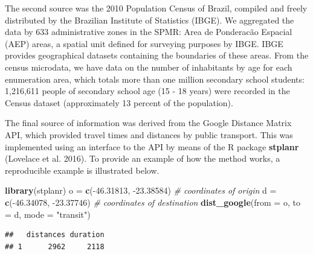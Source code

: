 \documentclass[]{article}
\newenvironment{Shaded}{\begin{snugshade}}{\end{snugshade}}
\newcommand{\KeywordTok}[1]{\textcolor[rgb]{0.13,0.29,0.53}{\textbf{{#1}}}}
\newcommand{\DataTypeTok}[1]{\textcolor[rgb]{0.13,0.29,0.53}{{#1}}}
\newcommand{\FloatTok}[1]{\textcolor[rgb]{0.00,0.00,0.81}{{#1}}}
\newcommand{\StringTok}[1]{\textcolor[rgb]{0.31,0.60,0.02}{{#1}}}
\newcommand{\CommentTok}[1]{\textcolor[rgb]{0.56,0.35,0.01}{\textit{{#1}}}}
\newcommand{\NormalTok}[1]{{#1}}
\begin{document}
The second source was the 2010 Population Census of Brazil,
compiled and freely distributed by the Brazilian Institute of Statistics
(IBGE). We aggregated the data by 633 administrative zones in the
SPMR: Area de Ponderacão Espacial (AEP)
areas, a spatial unit defined for surveying purposes by IBGE.
IBGE provides geographical datasets
containing the boundaries of these areas. From the census microdata, we
have data on the number of inhabitants by age for each enumeration area,
which totals more than one million secondary school students:
1,216,611 people of secondary school age (15 - 18 years) were recorded
in the Census dataset (approximately 13 percent of the population).

The final source of information was derived from the Google Distance
Matrix API, which provided travel times and distances by public
transport. This was implemented using an interface to the API by means
of the R package \textbf{stplanr} (Lovelace et al. 2016). To provide an
example of how the method works, a reproducible example is illustrated
below.

\begin{Shaded}
\begin{Highlighting}[]
\KeywordTok{library}\NormalTok{(stplanr)}
\NormalTok{o =}\StringTok{ }\KeywordTok{c}\NormalTok{(-}\FloatTok{46.31813}\NormalTok{, -}\FloatTok{23.38584}\NormalTok{) }\CommentTok{# coordinates of origin}
\NormalTok{d =}\StringTok{ }\KeywordTok{c}\NormalTok{(-}\FloatTok{46.34078}\NormalTok{, -}\FloatTok{23.37746}\NormalTok{) }\CommentTok{# coordinates of destination}
\KeywordTok{dist_google}\NormalTok{(}\DataTypeTok{from =} \NormalTok{o, }\DataTypeTok{to =} \NormalTok{d, }\DataTypeTok{mode =} \StringTok{"transit"}\NormalTok{)}
\end{Highlighting}
\end{Shaded}

\begin{verbatim}
##   distances duration
## 1      2962     2118
\end{verbatim}
\end{document}
